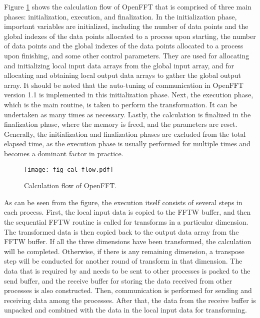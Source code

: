 Figure \ref{fig-cal-flow} shows the calculation flow of OpenFFT that is comprised of three main phases: initialization, execution, and finalization. In the initialization phase, important variables are initialized, including the number of data points and the global indexes of the data points allocated to a process upon starting, the number of data points and the global indexes of the data points allocated to a process upon finishing, and some other control parameters. They are used for allocating and initializing local input data arrays from the global input array, and for allocating and obtaining local output data arrays to gather the global output array. It should be noted that the auto-tuning of communication in OpenFFT version 1.1 is implemented in this initialization phase.  Next, the execution phase, which is the main routine, is taken to perform the transformation. It can be undertaken as many times as necessary. Lastly, the calculation is finalized in the finalization phase, where the memory is freed, and the parameters are reset. Generally, the initialization and finalization phases are excluded from the total elapsed time, as the execution phase is usually performed for multiple times and becomes a dominant factor in practice. 

\begin{figure}[htbp]
\begin{center}
\texttt{[image: fig-cal-flow.pdf]}
\end{center}
\caption{Calculation flow of OpenFFT.}
\label{fig-cal-flow}
\end{figure}

As can be seen from the figure, the execution itself consists of several steps in each process. First, the local input data is copied to the FFTW buffer, and then the sequential FFTW routine is called for transforms in a particular dimension. The transformed data is then copied back to the output data array from the FFTW buffer. If all the three dimensions have been transformed, the calculation will be completed. Otherwise, if there is any remaining dimension, a transpose step will be conducted for another round of transform in that dimension. The data that is required by and needs to be sent to other processes is packed to the send buffer, and the receive buffer for storing the data received from other processes is also constructed. Then, communication is performed for sending and receiving data among the processes. After that, the data from the receive buffer is unpacked and combined with the data in the local input data for transforming.  

